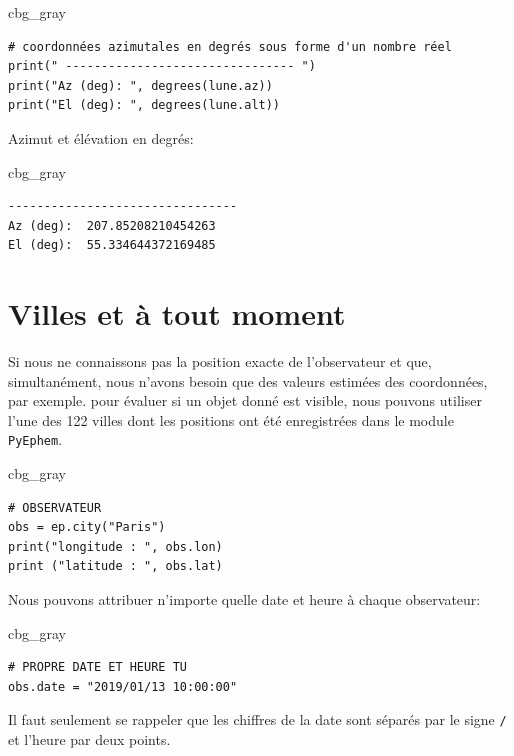 \documentclass[%
oneside,                 %
final,                   %
10pt,french]{article}
\newenvironment{_cod_tight}[1]{
   \def\FrameCommand{\colorbox{#1}}
   \FrameRule0.6pt\MakeFramed {\FrameRestore}\vskip3mm}
   {\vskip0mm\endMakeFramed}
\newenvironment{cod}[1]{
\bgroup\rmfamily
\fboxsep=0mm\relax
\begin{_cod_tight}{#1}
\list{}{\parsep=-2mm\parskip=0mm\topsep=0pt\leftmargin=2mm
\rightmargin=2\leftmargin\leftmargin=4pt\relax}
\item\relax}
{\endlist\end{_cod_tight}\egroup}
\begin{document}
\begin{cod}{cbg_gray}\begin{verbatim}
# coordonnées azimutales en degrés sous forme d'un nombre réel
print(" -------------------------------- ")
print("Az (deg): ", degrees(lune.az))
print("El (deg): ", degrees(lune.alt))
\end{verbatim}
\end{cod}
\noindent
Azimut et élévation en degrés:
\begin{cod}{cbg_gray}\begin{verbatim}
--------------------------------
Az (deg):  207.85208210454263
El (deg):  55.334644372169485
\end{verbatim}
\end{cod}
\noindent

\section{Villes et à tout moment}
Si nous ne connaissons pas la position exacte de l'observateur et que, simultanément, nous n'avons besoin que des valeurs estimées des coordonnées, par exemple. pour évaluer si un objet donné est visible, nous pouvons utiliser l'une des 122 villes dont les positions ont été enregistrées dans le module \texttt{PyEphem}.
\begin{cod}{cbg_gray}\begin{verbatim}
# OBSERVATEUR
obs = ep.city("Paris")
print("longitude : ", obs.lon)
print ("latitude : ", obs.lat)
\end{verbatim}
\end{cod}
\noindent
Nous pouvons attribuer n'importe quelle date et heure à chaque observateur:
\begin{cod}{cbg_gray}\begin{verbatim}
# PROPRE DATE ET HEURE TU
obs.date = "2019/01/13 10:00:00"
\end{verbatim}
\end{cod}
\noindent
Il faut seulement se rappeler que les chiffres de la date sont séparés par le signe \texttt{/} et l'heure par deux points.
\end{document}
